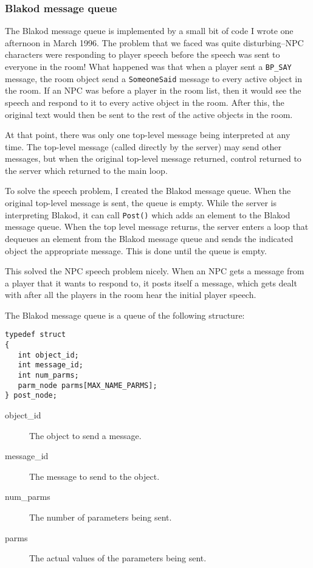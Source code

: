 \subsubsection{Blakod message queue}

The Blakod message queue is implemented by a small bit of code I wrote one afternoon
in March 1996.  The problem that we faced was quite disturbing--NPC characters
were responding to player speech before the speech was sent to everyone in the room!
What happened was that when a player sent a \texttt{BP\_SAY} message, the room object
send a \texttt{SomeoneSaid} message to every active object in the room.  If an NPC
was before a player in the room list, then it would see the speech and respond to it
to every active object in the room.  After this, the original text would then be sent
to the rest of the active objects in the room.

At that point, there was only one top-level message being interpreted at any time.  The
top-level message (called directly by the server) may send other messages, but when the
original top-level message returned, control returned to the server which returned
to the main loop.

To solve the speech problem, I created the Blakod message queue.  When the original
top-level message is sent, the queue is empty.  While the server is interpreting
Blakod, it can call \texttt{Post()} which adds an element to the Blakod message
queue.  When the top level message returns, the server enters a loop that
dequeues an element from the Blakod message queue and sends the indicated object
the appropriate message.  This is done until the queue is empty.

This solved the NPC speech problem nicely.  When an NPC gets a message from
a player that it wants to respond to, it posts itself a message, which gets
dealt with after all the players in the room hear the initial player speech.

The Blakod message queue is a queue of the following structure:
\begin{verbatim}
typedef struct
{
   int object_id;
   int message_id;
   int num_parms;
   parm_node parms[MAX_NAME_PARMS];
} post_node;
\end{verbatim}

\begin{description}
\item[object\_id] The object to send a message.
\item[message\_id] The message to send to the object.
\item[num\_parms] The number of parameters being sent.
\item[parms] The actual values of the parameters being sent.
\end{description}

